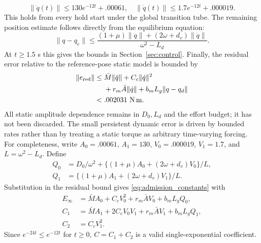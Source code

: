 \begin{equation}
 \|\ddot q(t)\|\le130e^{-12t}+.00061,\quad
 \|\dot q(t)\|\le1.7e^{-12t}+.000019.\label{eq:rate_tube}
\end{equation}
This holds from every hold start under the global transition tube. The remaining position estimate follows directly from the equilibrium equation:
\begin{equation}
 \|q-q_e\|\le
 \frac{(1+\mu)\|\ddot q\|+(2\omega+d_v)\|\dot q\|}{\omega^2-L_d}.
\end{equation}
At $t\ge1.5$ s this gives the bounds in Section~\ref{sec:control}. Finally, the residual error relative to the reference-pose static model is bounded by
\begin{align}
 \|e_{\rm red}\|\le{}&\bar M\|\ddot q\|+C_c\|\dot q\|^2\nonumber\\
 &+r_m\bar A\|\dot q\|+b_mL_g\|q-q_d\|\nonumber\\
 <{}&.002031\ {\rm N\,m}.
\end{align}
All static amplitude dependence remains in $D_0,L_d$ and the effort budget; it has not been discarded. The small persistent dynamic error is driven by bounded rates rather than by treating a static torque as arbitrary time-varying forcing. For completeness, write $A_0=.00061$, $A_1=130$, $V_0=.000019$, $V_1=1.7$, and $L=\omega^2-L_d$. Define
\begin{align}
 Q_0&=D_0/\omega^2+\{(1+\mu)A_0+(2\omega+d_v)V_0\}/L,\nonumber\\
 Q_1&=\{(1+\mu)A_1+(2\omega+d_v)V_1\}/L.\nonumber
\end{align}
Substitution in the residual bound gives \eqref{eq:admission_constants} with
\begin{align}
 E_\infty&=\bar M A_0+C_cV_0^2+r_m\bar A V_0+b_mL_gQ_0,\nonumber\\
 C_1&=\bar M A_1+2C_cV_0V_1+r_m\bar A V_1+b_mL_gQ_1,\nonumber\\
 C_2&=C_cV_1^2.\nonumber
\end{align}
Since $e^{-24t}\le e^{-12t}$ for $t\ge0$, $C=C_1+C_2$ is a valid single-exponential coefficient.
